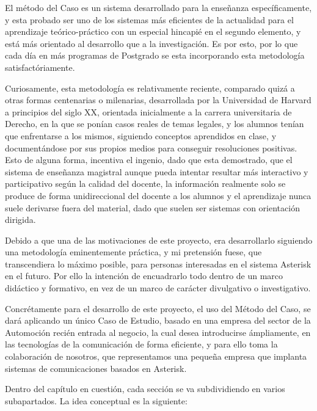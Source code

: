 El método del Caso es un sistema desarrollado para la enseñanza específicamente, y esta probado ser uno de los sistemas más eficientes de la actualidad para el aprendizaje teórico-práctico con un especial hincapié en el segundo elemento, y está más orientado al desarrollo que a la investigación. Es por esto, por lo que cada día en más programas de Postgrado se esta incorporando esta metodología satisfactóriamente.

Curiosamente, esta metodología es relativamente reciente, comparado quizá a otras formas centenarias o milenarias, desarrollada por la Universidad de Harvard a principios del siglo XX, orientada inicialmente a la carrera universitaria de Derecho, en la que se ponían casos reales de temas legales, y los alumnos tenían que enfrentarse a los mismos, siguiendo conceptos aprendidos en clase, y documentándose por sus propios medios para conseguir resoluciones positivas. Esto de alguna forma, incentiva el ingenio, dado que esta demostrado, que el sistema de enseñanza magistral aunque pueda intentar resultar más interactivo y participativo según la calidad del docente, la información realmente solo se produce de forma unidireccional del docente a los alumnos y el aprendizaje nunca suele derivarse fuera del material, dado que suelen ser sistemas con orientación dirigida.

Debido a que una de las motivaciones de este proyecto, era desarrollarlo siguiendo una metodología eminentemente práctica, y mi pretensión fuese, que transcendiera lo máximo posible, para personas interesadas en el sistema Asterisk en el futuro. Por ello la intención de encuadrarlo todo dentro de un marco didáctico y formativo, en vez de un marco de carácter divulgativo o investigativo.

Concrétamente para el desarrollo de este proyecto, el uso del Método del Caso, se dará aplicando un único Caso de Estudio, basado en una empresa del sector de la Automoción recién entrada al negocio, la cual desea introducirse ámpliamente, en las tecnologías de la comunicación de forma eficiente, y para ello toma la colaboración de nosotros, que representamos una pequeña empresa que implanta sistemas de comunicaciones basados en Asterisk.

Dentro del capítulo en cuestión, cada sección se va subdividiendo en varios subapartados. La idea conceptual es la siguiente:

